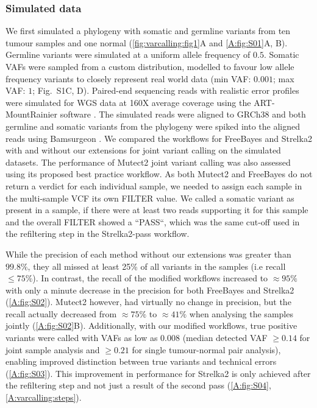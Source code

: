 \subsubsection{Simulated data}
\label{variantcalling-sec:simdata}
We first simulated a phylogeny with somatic and germline variants from ten tumour samples and one normal (\autoref{fig:varcalling:fig1}A and \autoref{A:fig:S01}A, B). Germline variants were simulated at a uniform allele frequency of $0.5$. Somatic VAFs were sampled from a custom distribution, modelled to favour low allele frequency variants to closely represent real world data (min VAF: $0.001$; max VAF: $1$; Fig.~S1C, D). Paired-end sequencing reads with realistic error profiles were simulated for WGS data at 160X average coverage using the ART-MountRainier software \parencite{Huang2011}. The simulated reads were aligned to GRCh38 and both germline and somatic variants from the phylogeny were spiked into the aligned reads using Bamsurgeon \parencite{Ewing2015}. We compared the workflows for FreeBayes and Strelka2 with and without our extensions for joint variant calling on the simulated datasets. The performance of Mutect2 joint variant calling was also assessed using its proposed best practice workflow. As both Mutect2 and FreeBayes do not return a verdict for each individual sample, we needed to assign each sample in the multi-sample VCF its own FILTER value. We called a somatic variant as present in a sample, if there were at least two reads supporting it for this sample and the overall FILTER showed a ``PASS``, which was the same cut-off used in the refiltering step in the Strelka2-pass workflow.

While the precision of each method without our extensions was greater than $99.8\%$, they all missed at least 25\% of all variants in the samples (i.e recall $\leq 75\%$). In contrast, the recall of the modified workflows increased to $\approx 95\%$ with only a minute decrease in the precision for both FreeBayes and Strelka2 (\autoref{A:fig:S02}). Mutect2 however, had virtually no change in precision, but the recall actually decreased from $\approx 75\%$ to $\approx 41\%$ when analysing the samples jointly (\autoref{A:fig:S02}B). Additionally, with our modified workflows, true positive variants were called with VAFs as low as 0.008 (median detected VAF $\geq 0.14$ for joint sample analysis and $\geq 0.21$ for single tumour-normal pair analysis), enabling improved distinction between true variants and technical errors (\autoref{A:fig:S03}). This improvement in performance for Strelka2 is only achieved after the refiltering step and not just a result of the second pass (\autoref{A:fig:S04}, \autoref{A:varcalling:steps}).

